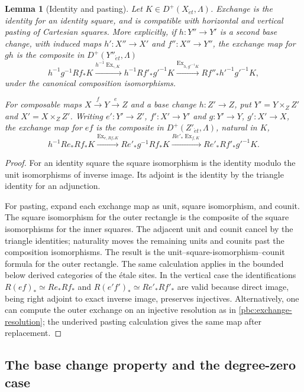 \documentclass[11pt,a4paper]{article}
\numberwithin{equation}{section}
\newtheorem{lemma}[theorem]{Lemma}
\theoremstyle{definition}
\theoremstyle{remark}
\newcommand{\D}{D}
\newcommand{\et}{\acute{e}t}
\begin{document}
\begin{lemma}[Identity and pasting]\label{pbc:exchange-pasting}
Let $K\in\D^+(X_{\et},\Lambda)$. Exchange is the identity for an
identity square, and is compatible with horizontal and vertical pasting
of Cartesian squares. More explicitly, if $h:Y''\to Y'$ is a second base
change, with induced maps $h':X''\to X'$ and $f'':X''\to Y''$, the
exchange map for $gh$ is the composite in $\D^+(Y''_{\et},\Lambda)$
\[
 h^{-1}g^{-1}Rf_*K
 \xrightarrow{h^{-1}\operatorname{Ex}_{\square,K}}
 h^{-1}Rf'_*g'^{-1}K
 \xrightarrow{\operatorname{Ex}_{h,g'^{-1}K}}
 Rf''_*h'^{-1}g'^{-1}K,
\]
under the canonical composition isomorphisms.

For composable maps $X\xrightarrow{f}Y\xrightarrow{e}Z$ and a base
change $h:Z'\to Z$, put $Y'=Y\times_ZZ'$ and $X'=X\times_ZZ'$.
Writing $e':Y'\to Z'$, $f':X'\to Y'$ and $g:Y'\to Y$,
$g':X'\to X$, the exchange map for $ef$ is the composite in
$\D^+(Z'_{\et},\Lambda)$, natural in $K$,
\[
 h^{-1}Re_*Rf_*K
 \xrightarrow{\operatorname{Ex}_{e,Rf_*K}}
 Re'_*g^{-1}Rf_*K
 \xrightarrow{Re'_*\operatorname{Ex}_{f,K}}
 Re'_*Rf'_*g'^{-1}K.
\]
\end{lemma}
\begin{proof}
For an identity square the square isomorphism is the identity modulo
the unit isomorphisms of inverse image. Its adjoint is the identity by
the triangle identity for an adjunction.

For pasting, expand each exchange map as unit, square isomorphism, and
counit. The square isomorphism for the outer rectangle is the composite
of the square isomorphisms for the inner squares. The adjacent unit and
counit cancel by the triangle identities; naturality moves the remaining
units and counits past the composition isomorphisms. The result is the
unit--square-isomorphism--counit formula for the outer rectangle. The
same calculation applies in the bounded below derived categories of the
\'etale sites. In the vertical
case the identifications $R(ef)_*\simeq Re_*Rf_*$ and
$R(e'f')_*\simeq Re'_*Rf'_*$ are valid because direct image, being
right adjoint to exact inverse image, preserves injectives. Alternatively,
one can compute the outer exchange on an injective resolution as in
\eqref{pbc:exchange-resolution}; the underived pasting calculation gives
the same map after replacement.
\end{proof}

\subsection{The base change property and the degree-zero case}
\end{document}
